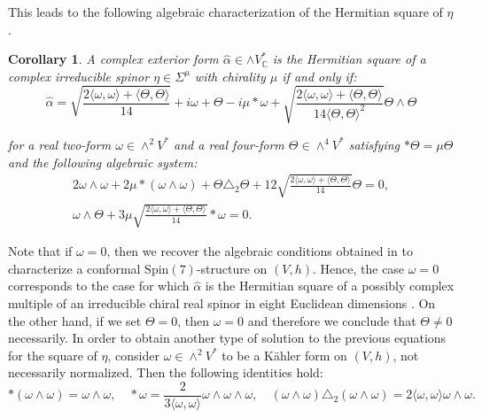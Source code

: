 \documentclass[10pt,a4paper,twoside,reqno]{amsart}
\theoremstyle{plain}
\newtheorem{cor}[thm]{Corollary}
\theoremstyle{definition}
\theoremstyle{remark}
\def\C{\mathbb{C}}
\def\Spin{\mathrm{Spin}}
\def\Spin{\mathrm{Spin}}
\newcommand{\escal}[1]{\langle#1\rangle}
\begin{document}
\noindent
This leads to the following algebraic characterization of the Hermitian square of $\eta$.

\begin{cor}
\label{cor:Hermitian8dimpure}
A complex exterior form $\widehat{\alpha} \in\wedge V^*_\C$ is the Hermitian square of a complex irreducible spinor $\eta\in\Sigma^{\mu}$ with chirality $\mu$ if and only if:
\begin{equation*}
\widehat{\alpha} = \sqrt{\frac{2\escal{\omega,\omega}+\escal{\Theta,\Theta}}{14}} + i\omega + \Theta-i\mu*\omega +  \sqrt{\frac{2\escal{\omega,\omega}+\escal{\Theta,\Theta}}{14 \escal{\Theta,\Theta}^2 }}\Theta \wedge \Theta
\end{equation*}

\noindent
for a real two-form $\omega\in\wedge^2V^*$ and a real four-form $\Theta\in\wedge^4V^*$ satisfying $*\Theta=\mu\Theta$ and the following algebraic system:
\begin{equation*}
\begin{gathered}
2\omega\wedge\omega+2\mu*(\omega\wedge\omega)+\Theta\triangle_2\Theta+12 \sqrt{\frac{2\escal{\omega,\omega}+\escal{\Theta,\Theta}}{14}}\Theta=0,\\
\omega\wedge\Theta+3\mu \sqrt{\frac{2\escal{\omega,\omega}+\escal{\Theta,\Theta}}{14}}*\omega=0.
\end{gathered}
\end{equation*} 
\end{cor}

\noindent
Note that if $\omega=0$, then we recover the algebraic conditions obtained in \cite[Theorem 3.22]{LS24_Spin7} to characterize a conformal $\Spin(7)$-structure on $(V,h)$. Hence, the case $\omega = 0$ corresponds to the case for which $\widehat{\alpha}$ is the Hermitian square of a possibly complex multiple of an irreducible chiral real spinor in eight Euclidean dimensions \cite{Spin89}. On the other hand, if we set $\Theta = 0$, then $\omega = 0$ and therefore we conclude that $\Theta\neq 0$ necessarily. In order to obtain another type of solution to the previous equations for the square of $\eta$, consider $\omega\in\wedge^2V^*$ to be a Kähler form on $(V,h)$, not necessarily normalized. Then the following identities hold: 
\begin{equation*}
*(\omega\wedge\omega)=\omega\wedge\omega,\quad *\omega=\frac{2}{3\escal{\omega,\omega}}\omega\wedge\omega\wedge\omega,\quad(\omega\wedge\omega)\triangle_2(\omega\wedge\omega)=2\escal{\omega,\omega}\omega\wedge\omega.    
\end{equation*}
\end{document}
